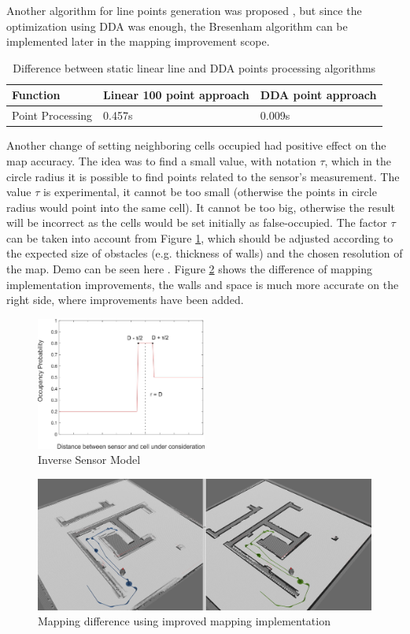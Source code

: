 \documentclass{article}
\begin{document}
Another algorithm for line points generation was proposed \cite{taltech-line}, but since the optimization using DDA was enough, the Bresenham algorithm can be implemented later in the mapping improvement scope.\newline


\begin{table}
\centering
\label{DDA}
\begin{tabular}{l|l|l}
Function & Linear 100 point approach & DDA point approach \\\hline
Point Processing &  0.457s & 0.009s\\
\end{tabular}
\caption{\label{tab:widgets}Difference between static linear line and DDA points processing algorithms}
\end{table}

Another change of setting neighboring cells occupied had positive effect on the map accuracy. The idea was to find a small value, with notation $\tau$, which in the circle radius it is possible to find points related to the sensor's measurement. The value $\tau$ is experimental, it cannot be too small (otherwise the points  in circle radius would point into the same cell). It cannot be too big, otherwise the result will be incorrect as the cells would be set initially as false-occupied. The factor $\tau$ can be taken into account from Figure \ref{fig:ism}, which should be adjusted according to the expected size of obstacles (e.g. thickness of walls) and the chosen resolution of the map. Demo can be seen here \cite{video-mapping}. Figure \ref{fig:diffence} shows the difference of mapping implementation improvements, the walls and space is much more accurate on the right side, where improvements have been added.

\begin{figure}
\centering
\includegraphics[width=0.5\textwidth]{ism.jpg}
\caption{\label{fig:ism}Inverse Sensor Model \cite{taltech-bayes}}
\end{figure}

\begin{figure}
\centering
\includegraphics[width=1.0\textwidth]{difference.jpg}
\caption{\label{fig:diffence}Mapping difference using improved mapping implementation \cite{video-mapping}}
\end{figure}




\end{document}
